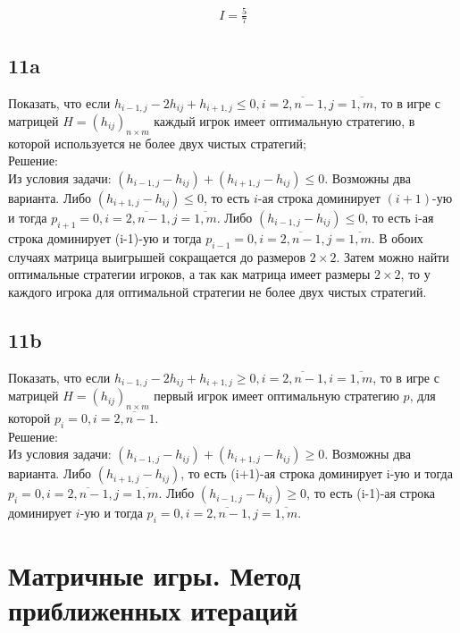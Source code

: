 \documentclass{article}
\begin{document}
\begin{gather*}
I = \frac{5}{7}
\end{gather*}
\subsection*{11a}
Показать, что если $h_{i-1,j} - 2 h_{ij} + h_{i+1,j} \leq 0, i = \overline{2, n-1},
j = \overline{1, m} $, то в игре с матрицей $H = (h_{ij})_{n \times m}$ каждый игрок имеет оптимальную стратегию, в которой используется не более двух чистых стратегий;
\\
Решение:\\
Из условия задачи: $(h_{i-1,j}-h_{ij})+(h_{i+1,j}-h_{ij}) \leq 0$. Возможны два варианта. Либо $(h_{i + 1, j}-h_{ij})\leq0$, то есть $i$-ая строка доминирует $(i+1)$-ую и тогда $p_{i+1} = 0, i=\overline{2, n-1}, j=\overline{1, m}$. Либо $(h_{i-1,j}-h_{ij})\leq 0$, то есть i-ая строка доминирует (i-1)-ую и тогда $p_{i-1} = 0, i=\overline{2, n-1}, j=\overline{1, m}$. В обоих случаях матрица выигрышей сокращается до размеров $2\times 2$. Затем можно найти оптимальные стратегии игроков, а так как матрица имеет размеры $2\times 2$, то у каждого игрока для оптимальной стратегии не более двух чистых стратегий.
\subsection*{11b}
Показать, что если $h_{i-1,j} - 2 h_{ij} + h_{i+1,j} \geq 0, i=\overline{2, n-1}, i=\overline{1, m}$, то в игре с матрицей $H=(h_{ij})_{n \times m}$ первый игрок имеет оптимальную стратегию $p$, для которой $p_i = 0, i=\overline{2, n-1}$.\\
Решение:\\
Из условия задачи: $(h_{i-1,j}-h_{ij})+(h_{i+1,j}-h_{ij})\geq 0$. Возможны два варианта. Либо $(h_{i+1,j}-h_{ij})$, то есть (i+1)-ая строка доминирует i-ую и тогда $p_i = 0, i=\overline{2, n-1}, j=\overline{1, m}$. Либо $(h_{i-1,j}-h_{ij})\geq 0$, то есть (i-1)-ая строка доминирует $i$-ую и тогда $p_i = 0, i=\overline{2, n-1}, j=\overline{1, m}$.
\section*{Матричные игры. Метод приближенных итераций}
\end{document}
